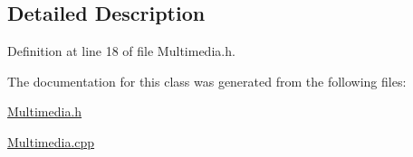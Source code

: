 \subsection{Detailed Description}


Definition at line 18 of file Multimedia.\+h.



The documentation for this class was generated from the following files\+:\begin{DoxyCompactItemize}
\item 
\mbox{\hyperlink{_multimedia_8h}{Multimedia.\+h}}\item 
\mbox{\hyperlink{_multimedia_8cpp}{Multimedia.\+cpp}}\end{DoxyCompactItemize}
